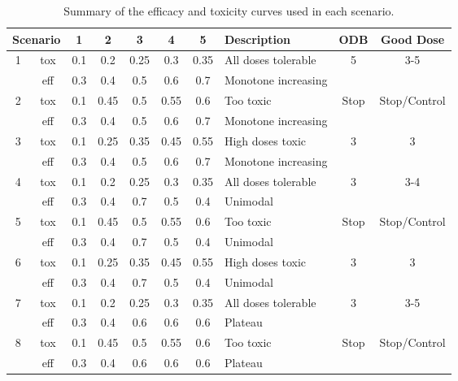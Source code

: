 \begin{table}[h!]
	\centering
	\caption{Summary of the efficacy and toxicity curves used in each scenario.}
	\label{tab_wt:sim-scenarios}
	\begin{tabular}{cc|ccccc|l|cc}
		\hline
		\multicolumn{2}{c|}{\textbf{Scenario}} & \textbf{1} & \textbf{2} & \textbf{3} & \textbf{4} & \textbf{5} & \textbf{Description} & \textbf{ODB} & \textbf{Good Dose} \\ \hline
		\multirow{2}{*}{1} & tox & 0.1 & 0.2 & 0.25 & 0.3 & 0.35 & All doses tolerable & \multirow{2}{*}{5} & \multirow{2}{*}{3-5} \\
		& eff & 0.3 & 0.4 & 0.5 & 0.6 & 0.7 & Monotone increasing &  &  \\ \hline
		\multirow{2}{*}{2} & tox & 0.1 & 0.45 & 0.5 & 0.55 & 0.6 & Too toxic & \multirow{2}{*}{Stop} & \multirow{2}{*}{Stop/Control} \\
		& eff & 0.3 & 0.4 & 0.5 & 0.6 & 0.7 & Monotone increasing &  &  \\ \hline
		\multirow{2}{*}{3} & tox & 0.1 & 0.25 & 0.35 & 0.45 & 0.55 & High doses toxic & \multirow{2}{*}{3} & \multirow{2}{*}{3} \\
		& eff & 0.3 & 0.4 & 0.5 & 0.6 & 0.7 & Monotone increasing &  &  \\ \hline
		\multirow{2}{*}{4} & tox & 0.1 & 0.2 & 0.25 & 0.3 & 0.35 & All doses tolerable & \multirow{2}{*}{3} & \multirow{2}{*}{3-4} \\
		& eff & 0.3 & 0.4 & 0.7 & 0.5 & 0.4 & Unimodal &  &  \\ \hline
		\multirow{2}{*}{5} & tox & 0.1 & 0.45 & 0.5 & 0.55 & 0.6 & Too toxic & \multirow{2}{*}{Stop} & \multirow{2}{*}{Stop/Control} \\
		& eff & 0.3 & 0.4 & 0.7 & 0.5 & 0.4 & Unimodal &  &  \\ \hline
		\multirow{2}{*}{6} & tox & 0.1 & 0.25 & 0.35 & 0.45 & 0.55 & High doses toxic & \multirow{2}{*}{3} & \multirow{2}{*}{3} \\
		& eff & 0.3 & 0.4 & 0.7 & 0.5 & 0.4 & Unimodal &  &  \\ \hline
		\multirow{2}{*}{7} & tox & 0.1 & 0.2 & 0.25 & 0.3 & 0.35 & All doses tolerable & \multirow{2}{*}{3} & \multirow{2}{*}{3-5} \\
		& eff & 0.3 & 0.4 & 0.6 & 0.6 & 0.6 & Plateau &  &  \\ \hline
		\multirow{2}{*}{8} & tox & 0.1 & 0.45 & 0.5 & 0.55 & 0.6 & Too toxic & \multirow{2}{*}{Stop} & \multirow{2}{*}{Stop/Control} \\
		& eff & 0.3 & 0.4 & 0.6 & 0.6 & 0.6 & Plateau &  &  \\ \hline

\end{tabular}
\end{table}
